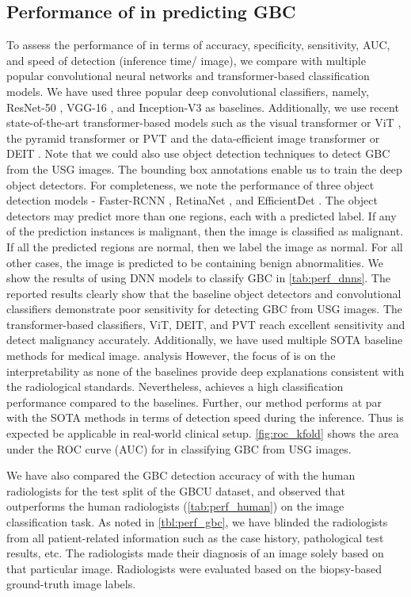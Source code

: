 \subsection{Performance of \radformer in predicting GBC}

To assess the performance of \radformer in terms of accuracy, specificity, sensitivity, AUC, and speed of detection (inference time/ image), we compare with multiple popular convolutional neural networks and transformer-based classification models. We have used three popular deep convolutional classifiers, namely, ResNet-50 \cite{resnet}, VGG-16 \cite{vgg}, and Inception-V3 \cite{inception} as baselines. Additionally, we use recent state-of-the-art transformer-based models such as the visual transformer or ViT \cite{dosovitskiy2020image}, the pyramid transformer or PVT \cite{wang2021pvtv2} and the data-efficient image transformer or DEIT \cite{touvron2021training}. Note that we could also use object detection techniques to detect GBC from the USG images. The bounding box annotations enable us to train the deep object detectors. For completeness, we note the performance of three object detection models - Faster-RCNN \cite{fasterrcnn}, RetinaNet \cite{retinanet}, and EfficientDet \cite{efficientdet}. The object detectors may predict more than one regions, each with a predicted label. If any of the prediction instances is malignant, then the image is classified as malignant. If all the predicted regions are normal, then we label the image as normal. For all other cases, the image is predicted to be containing benign abnormalities. We show the results of using DNN models to classify GBC in \cref{tab:perf_dnns}. The reported results clearly show that the baseline object detectors and convolutional classifiers demonstrate poor sensitivity for detecting GBC from USG images. The transformer-based classifiers, ViT, DEIT, and PVT reach excellent sensitivity and detect malignancy accurately. Additionally, we have used multiple SOTA baseline methods for medical image.  analysis However, the focus of \radformer is on the interpretability as none of the baselines provide deep explanations consistent with the radiological standards. Nevertheless, \radformer achieves a high classification performance compared to the baselines. Further, our method performs at par with the SOTA methods in terms of detection speed during the inference. Thus \radformer is expected be applicable in real-world clinical setup. \cref{fig:roc_kfold} shows the area under the ROC curve (AUC) for \radformer in classifying GBC from USG images. 
\par We have also compared the GBC detection accuracy of \radformer with the human radiologists for the test split of the GBCU dataset, and observed that \radformer outperforms the human radiologists (\cref{tab:perf_human}) on the image classification task. As noted in \cref{tbl:perf_gbc}, we have blinded the radiologists from all patient-related information such as the case history, pathological test results, etc. The radiologists made their diagnosis of an image solely based on that particular image. Radiologists were evaluated based on the biopsy-based ground-truth image labels.

